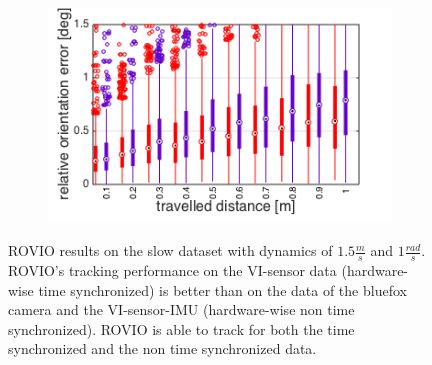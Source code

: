 \begin{figure}[h]
\begin{subfigure}[b]{0.42\textwidth}
    \caption{}
  \end{subfigure}
  \hfill
  \begin{subfigure}[b]{0.42\textwidth}
    \includegraphics[width=\textwidth]{images/slow/slow_roe.png}
    \caption{}
  \end{subfigure}
   \caption{ROVIO results on the slow dataset with dynamics of $1.5\frac{m}{s}$ and $1\frac{rad}{s}$. ROVIO's tracking performance on the VI-sensor data (hardware-wise time synchronized) is better than on the data of the bluefox camera and the VI-sensor-IMU (hardware-wise non time synchronized). ROVIO is able to track for both the time synchronized and the non time synchronized data.}
   \label{pics:appendix_slow}
\end{figure}